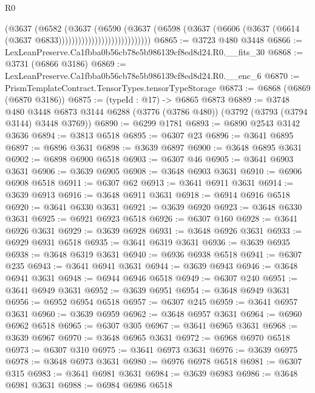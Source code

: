 \begin{lexlean}{R0}
\begin{coremodule}
                                      (@3637
                                        (@6582
                                          (@3637
                                            (@6590
                                              (@3637
                                                (@6598
                                                  (@3637
                                                    (@6606
                                                      (@3637
                                                        (@6614
                                                          (@3637 @6833))))))))))))))))))))))))))))
@6865 := @3723 @480 @3448
@6866 := LexLeanPreserve.Ca1fbba0b56cb78e5b986139cf8ed8d24.R0.__fits_30
@6868 := @3731 (@6866 @3186)
@6869 := LexLeanPreserve.Ca1fbba0b56cb78e5b986139cf8ed8d24.R0.__enc_6
@6870 := PrismTemplateContract.TensorTypes.tensorTypeStorage
@6873 := @6868 (@6869 (@6870 @3186))
@6875 := (typeId : @17) -> @6865 @6873
@6889 := @3748
    @480
    @3448
    @6873
    @3144
    @6288
    (@3776 (@3786 @480))
    (@3792 (@3793 (@3794 @3144) @3448 @3769))
@6890 := @6299 @1781
@6893 := @6890 @2543 @3142 @3636
@6894 := @3813 @6518
@6895 := @6307 @23
@6896 := @3641 @6895
@6897 := @6896 @3631
@6898 := @3639 @6897
@6900 := @3648 @6895 @3631
@6902 := @6898 @6900 @6518
@6903 := @6307 @46
@6905 := @3641 @6903 @3631
@6906 := @3639 @6905
@6908 := @3648 @6903 @3631
@6910 := @6906 @6908 @6518
@6911 := @6307 @62
@6913 := @3641 @6911 @3631
@6914 := @3639 @6913
@6916 := @3648 @6911 @3631
@6918 := @6914 @6916 @6518
@6920 := @3641 @6330 @3631
@6921 := @3639 @6920
@6923 := @3648 @6330 @3631
@6925 := @6921 @6923 @6518
@6926 := @6307 @160
@6928 := @3641 @6926 @3631
@6929 := @3639 @6928
@6931 := @3648 @6926 @3631
@6933 := @6929 @6931 @6518
@6935 := @3641 @6319 @3631
@6936 := @3639 @6935
@6938 := @3648 @6319 @3631
@6940 := @6936 @6938 @6518
@6941 := @6307 @235
@6943 := @3641 @6941 @3631
@6944 := @3639 @6943
@6946 := @3648 @6941 @3631
@6948 := @6944 @6946 @6518
@6949 := @6307 @240
@6951 := @3641 @6949 @3631
@6952 := @3639 @6951
@6954 := @3648 @6949 @3631
@6956 := @6952 @6954 @6518
@6957 := @6307 @245
@6959 := @3641 @6957 @3631
@6960 := @3639 @6959
@6962 := @3648 @6957 @3631
@6964 := @6960 @6962 @6518
@6965 := @6307 @305
@6967 := @3641 @6965 @3631
@6968 := @3639 @6967
@6970 := @3648 @6965 @3631
@6972 := @6968 @6970 @6518
@6973 := @6307 @310
@6975 := @3641 @6973 @3631
@6976 := @3639 @6975
@6978 := @3648 @6973 @3631
@6980 := @6976 @6978 @6518
@6981 := @6307 @315
@6983 := @3641 @6981 @3631
@6984 := @3639 @6983
@6986 := @3648 @6981 @3631
@6988 := @6984 @6986 @6518

\end{coremodule}
\end{lexlean}
